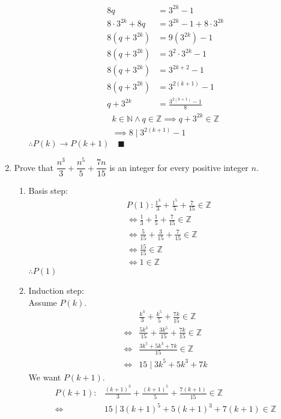 \documentclass[letterpaper, 12pt]{article}
\newcommand{\qed}{\quad \blacksquare}
\newcommand{\then}{\rightarrow}
\newcommand{\N}{\mathbb{N}}
\newcommand{\Z}{\mathbb{Z}}
\newcommand{\0}{\emptyset}
\begin{document}
\begin{enumerate}
\begin{enumerate}
\begin{align*}
    8q &= 3^{2k} - 1 \\
    8 \cdot 3^{2k} + 8q &= 3^{2k} - 1 + 8 \cdot 3^{2k} \\
    8(q + 3^{2k}) &= 9(3^{2k}) - 1 \\
    8(q + 3^{2k}) &= 3^2 \cdot 3^{2k} - 1 \\
    8(q + 3^{2k}) &= 3^{2k + 2} - 1 \\
    8(q + 3^{2k}) &= 3^{2(k + 1)} - 1 \\
    q + 3^{2k} &= \frac{3^{2(k + 1)} - 1}{8}
\end{align*}
\begin{gather*}
    k \in \N \wedge q \in \Z \implies q + 3^{2k} \in \Z \\
    \implies 8 \mid 3^{2(k+1)} - 1
\end{gather*}
$\therefore P(k) \then P(k + 1) \qed$
\pagebreak
\end{enumerate}
\item Prove that $\dfrac{n^3}{3} + \dfrac{n^5}{5} + \dfrac{7n}{15}$ is an integer for every 
positive integer $n$.
\begin{enumerate}
\item Basis step:
\begin{align*}
    &P(1): \frac{1^3}{3} + \frac{1^5}{5} + \frac{7}{15} \in \Z \\
    &\iff \frac{1}{3} + \frac{1}{5} + \frac{7}{15} \in \Z \\
    &\iff \frac{5}{15} + \frac{3}{15} + \frac{7}{15} \in \Z \\
    &\iff \frac{15}{15} \in \Z \\
    &\iff 1 \in \Z
\end{align*}
$\therefore P(1)$
\item Induction step: \\
Assume $P(k)$.
\begin{align*}
    & \frac{k^3}{3} + \frac{k^5}{5} + \frac{7k}{15} \in \Z \\
    \iff & \frac{5k^3}{15} + \frac{3k^5}{15} + \frac{7k}{15} \in \Z \\
    \iff & \frac{3k^5 + 5k^3 + 7k}{15} \in \Z \\
    \iff & 15 \mid 3k^5 + 5k^3 + 7k
\end{align*}
We want $P(k + 1)$.
\begin{align*}
    P(k + 1): & \frac{(k+1)^3}{3} + \frac{(k+1)^5}{5} + \frac{7(k+1)}{15} \in \Z \\
    \iff & 15 \mid 3(k+1)^5 + 5(k+1)^3 + 7(k+1) \in \Z \\
\end{align*}

\end{enumerate}
\end{enumerate}
\end{document}
